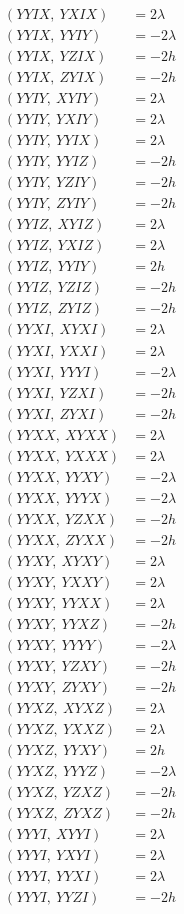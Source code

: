 \documentclass{article}
\begin{document}
\begin{align*}
  (YYIX,\ YXIX) &= 2 \lambda \\
  (YYIX,\ YYIY) &= - 2 \lambda \\
  (YYIX,\ YZIX) &= - 2 h \\
  (YYIX,\ ZYIX) &= - 2 h \\
  (YYIY,\ XYIY) &= 2 \lambda \\
  (YYIY,\ YXIY) &= 2 \lambda \\
  (YYIY,\ YYIX) &= 2 \lambda \\
  (YYIY,\ YYIZ) &= - 2 h \\
  (YYIY,\ YZIY) &= - 2 h \\
  (YYIY,\ ZYIY) &= - 2 h \\
  (YYIZ,\ XYIZ) &= 2 \lambda \\
  (YYIZ,\ YXIZ) &= 2 \lambda \\
  (YYIZ,\ YYIY) &= 2 h \\
  (YYIZ,\ YZIZ) &= - 2 h \\
  (YYIZ,\ ZYIZ) &= - 2 h \\
  (YYXI,\ XYXI) &= 2 \lambda \\
  (YYXI,\ YXXI) &= 2 \lambda \\
  (YYXI,\ YYYI) &= - 2 \lambda \\
  (YYXI,\ YZXI) &= - 2 h \\
  (YYXI,\ ZYXI) &= - 2 h \\
  (YYXX,\ XYXX) &= 2 \lambda \\
  (YYXX,\ YXXX) &= 2 \lambda \\
  (YYXX,\ YYXY) &= - 2 \lambda \\
  (YYXX,\ YYYX) &= - 2 \lambda \\
  (YYXX,\ YZXX) &= - 2 h \\
  (YYXX,\ ZYXX) &= - 2 h \\
  (YYXY,\ XYXY) &= 2 \lambda \\
  (YYXY,\ YXXY) &= 2 \lambda \\
  (YYXY,\ YYXX) &= 2 \lambda \\
  (YYXY,\ YYXZ) &= - 2 h \\
  (YYXY,\ YYYY) &= - 2 \lambda \\
  (YYXY,\ YZXY) &= - 2 h \\
  (YYXY,\ ZYXY) &= - 2 h \\
  (YYXZ,\ XYXZ) &= 2 \lambda \\
  (YYXZ,\ YXXZ) &= 2 \lambda \\
  (YYXZ,\ YYXY) &= 2 h \\
  (YYXZ,\ YYYZ) &= - 2 \lambda \\
  (YYXZ,\ YZXZ) &= - 2 h \\
  (YYXZ,\ ZYXZ) &= - 2 h \\
  (YYYI,\ XYYI) &= 2 \lambda \\
  (YYYI,\ YXYI) &= 2 \lambda \\
  (YYYI,\ YYXI) &= 2 \lambda \\
  (YYYI,\ YYZI) &= - 2 h
\end{align*}
\end{document}
